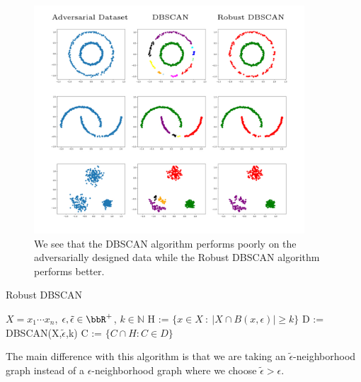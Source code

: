     \begin{figure}[H]
        \centering
        \includegraphics[width=0.9\textwidth]{chapter_2/files/adverse_data.jpeg}
        \caption{We see that the DBSCAN algorithm performs poorly on the adversarially designed data while the Robust DBSCAN algorithm performs better.}
        \label{fig:robust_data}
    \end{figure}
    
  \begin{algorithm}[H]
    \caption{Robust DBSCAN}
    \label{dbscan++ alg}
    \begin{algorithmic}[1]
      \renewcommand\algorithmicrequire{\textbf{Input}}
      \REQUIRE $X = {x_1\cdots x_n}$, $\epsilon, \tilde{\epsilon} \in \bbR^+$, $k \in \mathbb{N}$
      \STATE H := $\{x \in X \ : \ |X \cap B(x, \epsilon)| \geq k\}$
      \STATE D := DBSCAN(X,$\tilde{\epsilon}$,k)
      \STATE C := $\{ C \cap H : C \in D \}$
    \end{algorithmic}
  \end{algorithm}
  
  The main difference with this algorithm is that we are taking an $\tilde{\epsilon}$-neighborhood graph instead of a $\epsilon$-neighborhood graph where we choose $\tilde{\epsilon}>\epsilon$. 
  
